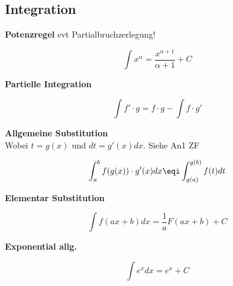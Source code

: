 \subsection{Integration}
\begin{center}
	\begin{minipage}{0.2\textwidth}
		\noindent\textbf{Potenzregel} evt Partialbruchzerlegung!
	\end{minipage}%
	\begin{minipage}{0.3\textwidth}
		\[ \int x^\alpha = \frac{x^{\alpha  + 1}}{\alpha + 1} + C \]
	\end{minipage}
\end{center}

\begin{center}
	\begin{minipage}{0.2\textwidth}
		\noindent\textbf{Partielle Integration}
	\end{minipage}%
	\begin{minipage}{0.3\textwidth}
		\[\int f' \cdot g = f \cdot g - \int f \cdot g'\]
	\end{minipage}
\end{center}

\begin{center}
	\begin{minipage}{0.2\textwidth}
		\noindent\textbf{Allgemeine Substitution}\\
		Wobei $t=g(x)$ und $dt = g'(x)dx$. Siehe An1 ZF
	\end{minipage}%
	\begin{minipage}{0.3\textwidth}
		\[\int_{a}^{b} f(g(x)) \cdot g'(x)dx \eqi \int_{g(a)}^{g(b)} f(t) dt\]
	\end{minipage}
\end{center}

\begin{center}
	\begin{minipage}{0.2\textwidth}
		\noindent\textbf{Elementar Substitution}
	\end{minipage}%
	\begin{minipage}{0.3\textwidth}
		\[\int f(ax + b)dx = \frac{1}{a}F(ax+b)+C\]
	\end{minipage}
\end{center}

\begin{center}
	\begin{minipage}{0.2\textwidth}
		\noindent\textbf{Exponential allg.}
	\end{minipage}%
	\begin{minipage}{0.3\textwidth}
		\[\int e^xdx = e^x + C\]
	\end{minipage}
\end{center}


